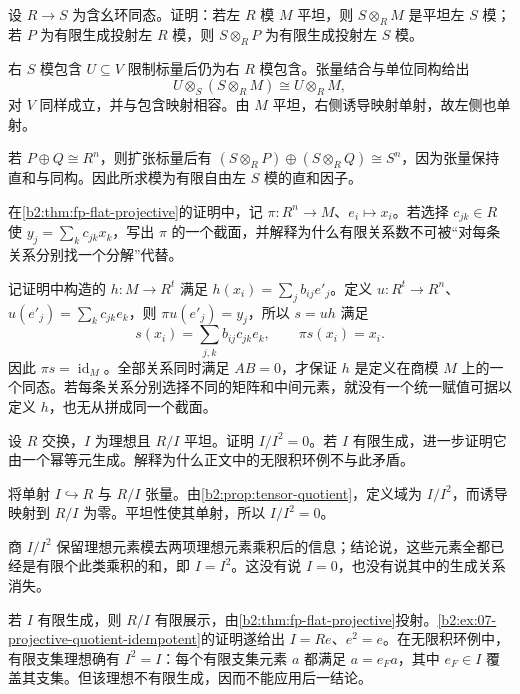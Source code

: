 \begin{exercise}\label{b2:ex:07-flat-base-change}
	设 \(R\to S\) 为含幺环同态。证明：若左 \(R\) 模 \(M\) 平坦，则 \(S\otimes_R M\) 是平坦左 \(S\) 模；若 \(P\) 为有限生成投射左 \(R\) 模，则 \(S\otimes_R P\) 为有限生成投射左 \(S\) 模。
\end{exercise}
\begin{solution}
	右 \(S\) 模包含 \(U\subseteq V\) 限制标量后仍为右 \(R\) 模包含。张量结合与单位同构给出
	\[
		U\otimes_S(S\otimes_R M)\cong U\otimes_R M,
	\]
	对 \(V\) 同样成立，并与包含映射相容。由 \(M\) 平坦，右侧诱导映射单射，故左侧也单射。

	若 \(P\oplus Q\cong R^n\)，则扩张标量后有 \((S\otimes_R P)\oplus(S\otimes_R Q)\cong S^n\)，因为张量保持直和与同构。因此所求模为有限自由左 \(S\) 模的直和因子。
\end{solution}

\begin{exercise}\label{b2:ex:07-fp-splitting-formula}
	在\cref{b2:thm:fp-flat-projective}的证明中，记 \(\pi:R^n\to M\)、\(e_i\mapsto x_i\)。若选择 \(c_{jk}\in R\) 使 \(y_j=\sum_k c_{jk}x_k\)，写出 \(\pi\) 的一个截面，并解释为什么有限关系数不可被“对每条关系分别找一个分解”代替。
\end{exercise}
\begin{solution}
	记证明中构造的 \(h:M\to R^t\) 满足 \(h(x_i)=\sum_jb_{ij}e'_j\)。定义 \(u:R^t\to R^n\)、\(u(e'_j)=\sum_kc_{jk}e_k\)，则 \(\pi u(e'_j)=y_j\)，所以 \(s=uh\) 满足
	\[
		s(x_i)=\sum_{j,k}b_{ij}c_{jk}e_k,\qquad \pi s(x_i)=x_i.
	\]
	因此 \(\pi s=\operatorname{id}_M\)。全部关系同时满足 \(AB=0\)，才保证 \(h\) 是定义在商模 \(M\) 上的一个同态。若每条关系分别选择不同的矩阵和中间元素，就没有一个统一赋值可据以定义 \(h\)，也无从拼成同一个截面。
\end{solution}

\begin{exercise}\label{b2:ex:07-flat-quotient-ideal}
	设 \(R\) 交换，\(I\) 为理想且 \(R/I\) 平坦。证明 \(I/I^2=0\)。若 \(I\) 有限生成，进一步证明它由一个幂等元生成。解释为什么正文中的无限积环例不与此矛盾。
\end{exercise}
\begin{solution}
	将单射 \(I\hookrightarrow R\) 与 \(R/I\) 张量。由\cref{b2:prop:tensor-quotient}，定义域为 \(I/I^2\)，而诱导映射到 \(R/I\) 为零。平坦性使其单射，所以 \(I/I^2=0\)。

	商 \(I/I^2\) 保留理想元素模去两项理想元素乘积后的信息；结论说，这些元素全都已经是有限个此类乘积的和，即 \(I=I^2\)。这没有说 \(I=0\)，也没有说其中的生成关系消失。

	若 \(I\) 有限生成，则 \(R/I\) 有限展示，由\cref{b2:thm:fp-flat-projective}投射。\cref{b2:ex:07-projective-quotient-idempotent}的证明遂给出 \(I=Re\)、\(e^2=e\)。在无限积环例中，有限支集理想确有 \(I^2=I\)：每个有限支集元素 \(a\) 都满足 \(a=e_Fa\)，其中 \(e_F\in I\) 覆盖其支集。但该理想不有限生成，因而不能应用后一结论。
\end{solution}

